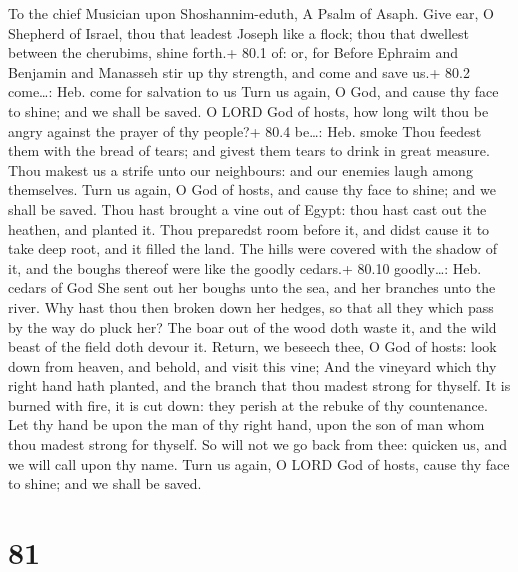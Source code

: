 To the chief Musician upon Shoshannim-eduth, A Psalm of Asaph.
 Give ear, O Shepherd of Israel, thou that leadest Joseph
like a flock; thou that dwellest between the cherubims, shine forth.+
80.1 of: or, for  Before Ephraim and Benjamin and Manasseh
stir up thy strength, and come and save us.+ 80.2 come\ldots: Heb. come
for salvation to us  Turn us again, O God, and cause thy
face to shine; and we shall be saved.  O LORD God of hosts,
how long wilt thou be angry against the prayer of thy people?+ 80.4
be\ldots: Heb. smoke  Thou feedest them with the bread of
tears; and givest them tears to drink in great measure. 
Thou makest us a strife unto our neighbours: and our enemies laugh among
themselves.  Turn us again, O God of hosts, and cause thy
face to shine; and we shall be saved.  Thou hast brought a
vine out of Egypt: thou hast cast out the heathen, and planted it.
 Thou preparedst room before it, and didst cause it to take
deep root, and it filled the land.  The hills were covered
with the shadow of it, and the boughs thereof were like the goodly
cedars.+ 80.10 goodly\ldots: Heb. cedars of God  She sent
out her boughs unto the sea, and her branches unto the river.
 Why hast thou then broken down her hedges, so that all
they which pass by the way do pluck her?  The boar out of
the wood doth waste it, and the wild beast of the field doth devour it.
 Return, we beseech thee, O God of hosts: look down from
heaven, and behold, and visit this vine;  And the vineyard
which thy right hand hath planted, and the branch that thou madest
strong for thyself.  It is burned with fire, it is cut
down: they perish at the rebuke of thy countenance.  Let
thy hand be upon the man of thy right hand, upon the son of man whom
thou madest strong for thyself.  So will not we go back
from thee: quicken us, and we will call upon thy name. 
Turn us again, O LORD God of hosts, cause thy face to shine; and we
shall be saved.

\hypertarget{section-80}{%
\section{81}\label{section-80}}


